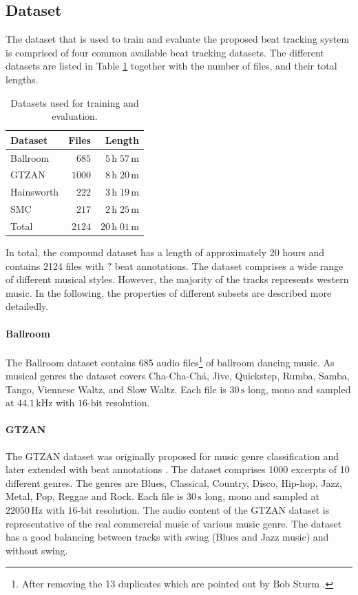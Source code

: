 \documentclass{scrartcl}
\begin{document}
\subsection{Dataset}
The dataset that is used to train and evaluate the proposed beat tracking system is comprised of four common available beat tracking datasets. The different datasets  are listed in Table \ref{tab:datasets} together with the number of files, and their total lengths.
\begin{table}[htbp]
\caption{Datasets used for training and evaluation.}
\label{tab:datasets}
\centering
\begin{tabular}{lrr}
\hline
\hline
\textbf{Dataset} & \textbf{Files} & \textbf{Length} \\
\hline
Ballroom \cite{Gouyon2006b, Krebs2013} & $685$ & $5\,\text{h} \;57\,\text{m}$\\
GTZAN \cite{Tzanetakis2002b, marchand2015swing} & $1000$ & $8\,\text{h}\;20\,\text{m}$\\
Hainsworth \cite{Hainsworth2004} & $222$ & $3\,\text{h}\;19\,\text{m}$\\
SMC \cite{Holzapfel2012} & $217$ & $2\,\text{h}\;25\,\text{m}$\\    
\hline
Total & $2124$ & $ 20\,\text{h}\; 01\,\text{m}$\\  
\hline
\hline
\end{tabular}
\end{table}  
In total, the compound dataset has a length of approximately 20 hours and contains 2124 files with $?$ beat annotations. The dataset comprises a wide range of different musical styles. However, the majority of the tracks represents western music. In the following, the properties of different subsets are described more detailedly.   


\paragraph{Ballroom} 
The Ballroom dataset \cite{Gouyon2006b, Krebs2013} contains 685 audio files\footnote{After removing the 13 duplicates which are pointed out by Bob Sturm \cite{Sturm2014}.} of ballroom dancing music. As musical genres the dataset covers Cha-Cha-Chá, Jive, Quickstep, Rumba, Samba, Tango, Viennese Waltz, and Slow Waltz. Each file is $30\,\text{s}$ long, mono and sampled at $44.1\,\text{kHz}$ with $16\text{-bit}$ resolution.

\paragraph{GTZAN} 
The GTZAN \cite{Tzanetakis2002b} dataset was originally proposed for music genre classification and later extended with beat annotations \cite{marchand2015swing}. The dataset comprises 1000 excerpts of 10 different genres. The genres are Blues, Classical, Country, Disco, Hip-hop, Jazz, Metal, Pop, Reggae and Rock. Each file is $30\,\text{s}$ long, mono and sampled at $22050\,\text{Hz}$ with $16\text{-bit}$ resolution. The audio content of the GTZAN dataset is representative of the real commercial music of various music genre. The dataset has a good balancing between tracks with swing (Blues and Jazz music) and without swing.
\end{document}
